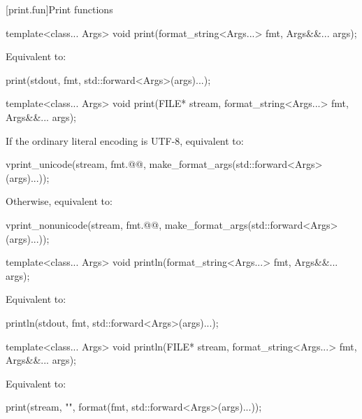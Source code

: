 [print.fun]{Print functions}

%
\begin{itemdecl}
template<class... Args>
  void print(format_string<Args...> fmt, Args&&... args);
\end{itemdecl}

\begin{itemdescr}
\pnum
\effects
Equivalent to:
\begin{codeblock}
print(stdout, fmt, std::forward<Args>(args)...);
\end{codeblock}
\end{itemdescr}

%
\begin{itemdecl}
template<class... Args>
  void print(FILE* stream, format_string<Args...> fmt, Args&&... args);
\end{itemdecl}

\begin{itemdescr}
\pnum
\effects
If the ordinary literal encoding is UTF-8, equivalent to:
\begin{codeblock}
vprint_unicode(stream, fmt.@@, make_format_args(std::forward<Args>(args)...));
\end{codeblock}
Otherwise, equivalent to:
\begin{codeblock}
vprint_nonunicode(stream, fmt.@@, make_format_args(std::forward<Args>(args)...));
\end{codeblock}
\end{itemdescr}

%
\begin{itemdecl}
template<class... Args>
  void println(format_string<Args...> fmt, Args&&... args);
\end{itemdecl}

\begin{itemdescr}
\pnum
\effects
Equivalent to:
\begin{codeblock}
println(stdout, fmt, std::forward<Args>(args)...);
\end{codeblock}
\end{itemdescr}

%
\begin{itemdecl}
template<class... Args>
  void println(FILE* stream, format_string<Args...> fmt, Args&&... args);
\end{itemdecl}

\begin{itemdescr}
\pnum
\effects
Equivalent to:
\begin{codeblock}
print(stream, "{}\n", format(fmt, std::forward<Args>(args)...));
\end{codeblock}
\end{itemdescr}

